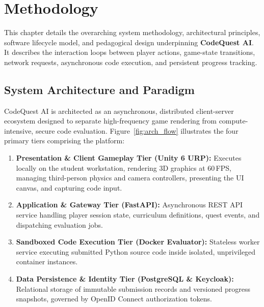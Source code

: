 \chapter{Methodology}
\label{ch:method}

This chapter details the overarching system methodology, architectural principles, software lifecycle model, and pedagogical design underpinning \textbf{CodeQuest AI}. It describes the interaction loops between player actions, game-state transitions, network requests, asynchronous code execution, and persistent progress tracking.

\section{System Architecture and Paradigm}
CodeQuest AI is architected as an asynchronous, distributed client-server ecosystem designed to separate high-frequency game rendering from compute-intensive, secure code evaluation. Figure~\ref{fig:arch_flow} illustrates the four primary tiers comprising the platform:
\begin{enumerate}
    \item \textbf{Presentation \& Client Gameplay Tier (Unity 6 URP):} Executes locally on the student workstation, rendering 3D graphics at 60\,FPS, managing third-person physics and camera controllers, presenting the UI canvas, and capturing code input.
    \item \textbf{Application \& Gateway Tier (FastAPI):} Asynchronous REST API service handling player session state, curriculum definitions, quest events, and dispatching evaluation jobs.
    \item \textbf{Sandboxed Code Execution Tier (Docker Evaluator):} Stateless worker service executing submitted Python source code inside isolated, unprivileged container instances.
    \item \textbf{Data Persistence \& Identity Tier (PostgreSQL \& Keycloak):} Relational storage of immutable submission records and versioned progress snapshots, governed by OpenID Connect authorization tokens.
\end{enumerate}

